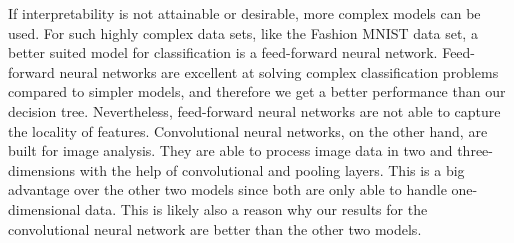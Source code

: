 \documentclass[../main.tex]{subfiles}
\begin{document}
If interpretability is not attainable or desirable, more complex 
models can be used.
For such highly complex data sets, like the Fashion MNIST data set, 
a better suited model for classification is a feed-forward 
neural network. Feed-forward neural networks are excellent at 
solving complex classification problems compared to simpler models, 
and therefore we get a better performance than our decision tree. 
Nevertheless, feed-forward neural networks are not able to capture 
the locality of features. 
Convolutional neural networks, on the other hand, are built for 
image analysis. They are able to process image data in two and three-
dimensions with the help of convolutional and pooling layers. 
This is a big advantage over the other two models since both are 
only able to handle one-dimensional data.
This is likely also a reason why our results for the 
convolutional neural network are better than the other two models.
\end{document}

